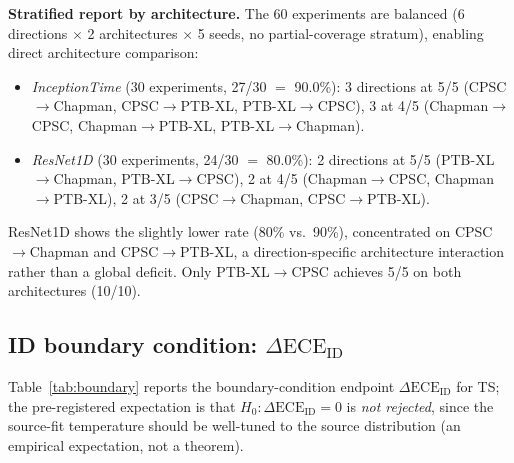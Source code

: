 \documentclass[review,12pt,nonatbib]{elsarticle}
\begin{document}
\textbf{Stratified report by architecture.} The 60 experiments are
balanced (6 directions $\times$ 2 architectures $\times$ 5 seeds, no
partial-coverage stratum), enabling direct architecture comparison:
\begin{itemize}
    \item \emph{InceptionTime} (30 experiments, 27/30 $=$ 90.0\%):
    3 directions at 5/5 (CPSC$\rightarrow$Chapman,
    CPSC$\rightarrow$PTB-XL, PTB-XL$\rightarrow$CPSC), 3 at 4/5
    (Chapman$\rightarrow$CPSC, Chapman$\rightarrow$PTB-XL,
    PTB-XL$\rightarrow$Chapman).
    \item \emph{ResNet1D} (30 experiments, 24/30 $=$ 80.0\%):
    2 directions at 5/5 (PTB-XL$\rightarrow$Chapman,
    PTB-XL$\rightarrow$CPSC), 2 at 4/5 (Chapman$\rightarrow$CPSC,
    Chapman$\rightarrow$PTB-XL), 2 at 3/5 (CPSC$\rightarrow$Chapman,
    CPSC$\rightarrow$PTB-XL).
\end{itemize}
ResNet1D shows the slightly lower rate (80\% vs.\ 90\%), concentrated
on CPSC$\rightarrow$Chapman and CPSC$\rightarrow$PTB-XL, a
direction-specific architecture interaction rather than a global
deficit. Only PTB-XL$\rightarrow$CPSC achieves 5/5 on both
architectures (10/10).

\subsection{ID boundary condition: $\Delta\text{ECE}_{\text{ID}}$}
\label{sec:boundary}
Table~\ref{tab:boundary} reports the boundary-condition endpoint
$\Delta\text{ECE}_{\text{ID}}$ for TS; the pre-registered expectation is
that $H_0:\Delta\text{ECE}_{\text{ID}}=0$ is \emph{not rejected}, since
the source-fit temperature should be well-tuned to the source
distribution (an empirical expectation, not a theorem).
\end{document}
